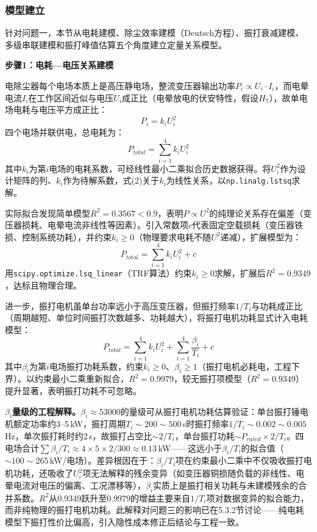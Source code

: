 
\subsubsection{模型建立}

针对问题一，本节从电耗建模、除尘效率建模（Deutsch方程）、振打衰减建模、多级串联建模和振打峰值估算五个角度建立定量关系模型。

\textbf{步骤1：电耗—电压关系建模}

电除尘器每个电场本质上是高压静电场，整流变压器输出功率$P_i\propto U_i\cdot I_i$，而电晕电流$I_i$在工作区间近似与电压$U_i$成正比（电晕放电的伏安特性，假设$H_7$），故单电场电耗与电压平方成正比：
\begin{equation}
    P_i = k_i U_i^2
\end{equation}
四个电场并联供电，总电耗为：
\begin{equation}
    P_{total} = \sum_{i=1}^{4} k_i U_i^2
\end{equation}
其中$k_i$为第$i$电场的电耗系数，可经线性最小二乘拟合历史数据获得。将$U_i^2$作为设计矩阵的列、$k_i$作为待解系数，式(2)关于$k_i$为线性关系，以\texttt{np.linalg.lstsq}求解。

实际拟合发现简单模型$R^2=0.3567<0.9$，表明$P\propto U^2$的纯理论关系存在偏差（变压器损耗、电晕电流非线性等因素）。引入常数项$c$代表固定空载损耗（变压器铁损、控制系统功耗），并约束$k_i\geq0$（物理要求电耗不随$U^2$递减），扩展模型为：
\begin{equation}
    P_{total} = \sum_{i=1}^{4} k_i U_i^2 + c
\end{equation}
用\texttt{scipy.optimize.lsq\_linear}（TRF算法）约束$k_i\geq0$求解，扩展后$R^2=0.9349$，达标且物理合理。

进一步，振打电机虽单台功率远小于高压变压器，但振打频率$1/T_i$与功耗成正比（周期越短、单位时间振打次数越多、功耗越大），将振打电机功耗显式计入电耗模型：
\begin{equation}
    P_{total} = \sum_{i=1}^{4} k_i U_i^2 + \sum_{i=1}^{4} \frac{\beta_i}{T_i} + c
\end{equation}
其中$\beta_i$为第$i$电场振打功耗系数，约束$k_i\geq0$、$\beta_i\geq 1$（振打电机必耗电，工程下界）。以约束最小二乘重新拟合，$R^2=0.9979$，较无振打项模型（$R^2=0.9349$）提升显著，表明振打功耗不可忽略。

\textbf{$\beta_i$量级的工程解释。}$\beta_i\approx 53000$的量级可从振打电机功耗估算验证：单台振打锤电机额定功率约3--5\,kW，振打周期$T_i\sim 200\sim500$\,s时振打频率$1/T_i\sim 0.002\sim0.005$\,Hz，单次振打耗时约2\,s，故振打占空比$\sim 2/T_i$，单台振打功耗$\sim P_{rated}\times 2/T_i$。四电场合计$\sum\beta_i/T_i\approx 4\times 5\times 2/300\approx 0.13$\,kW——这远小于$\beta_i/T_i$的拟合值（$\sim 100\sim265$\,kW/电场）。差异根因在于：$\beta_i/T_i$项在约束最小二乘中不仅吸收振打电机功耗，还吸收了$U_i^2$项无法解释的残余变异（如变压器铜损随负载的非线性、电晕电流对电压的偏离、工况漂移等），$\beta_i$实质上是振打相关功耗与未建模残余的合并系数。$R^2$从0.9349跃升至0.9979的增益主要来自$1/T_i$项对数据变异的拟合能力，而非纯物理的振打电机功耗。此解释对问题三的影响已在5.3.2节讨论——纯电耗模型下振打性价比偏高，引入隐性成本修正后结论与工程一致。

